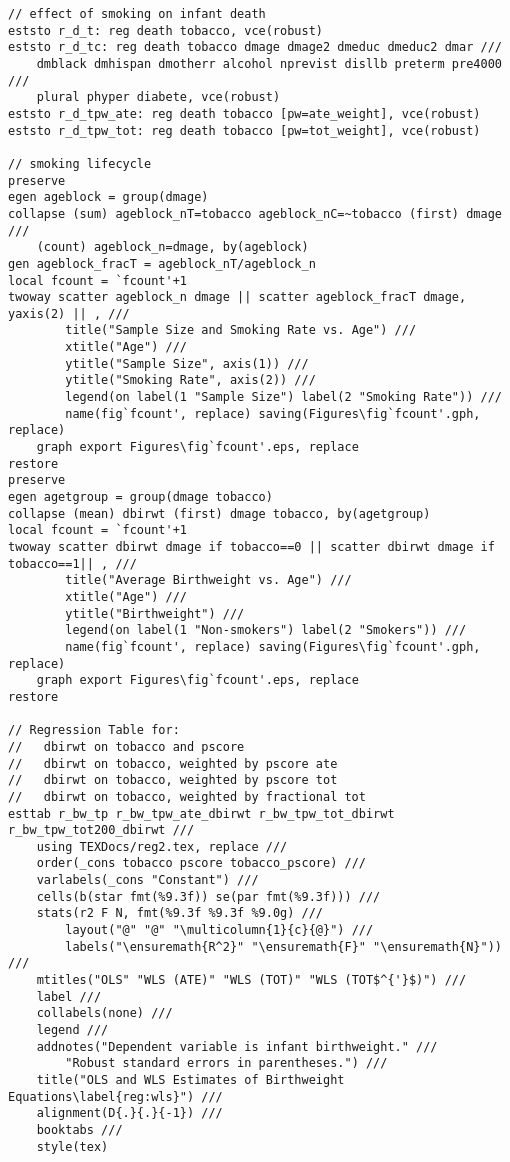 \documentclass{article}
\begin{document}
\begin{verbatim}
// effect of smoking on infant death
eststo r_d_t: reg death tobacco, vce(robust)
eststo r_d_tc: reg death tobacco dmage dmage2 dmeduc dmeduc2 dmar ///
	dmblack dmhispan dmotherr alcohol nprevist disllb preterm pre4000 ///
	plural phyper diabete, vce(robust)
eststo r_d_tpw_ate: reg death tobacco [pw=ate_weight], vce(robust)
eststo r_d_tpw_tot: reg death tobacco [pw=tot_weight], vce(robust)

// smoking lifecycle
preserve
egen ageblock = group(dmage)
collapse (sum) ageblock_nT=tobacco ageblock_nC=~tobacco (first) dmage ///
	(count) ageblock_n=dmage, by(ageblock)
gen ageblock_fracT = ageblock_nT/ageblock_n
local fcount = `fcount'+1
twoway scatter ageblock_n dmage || scatter ageblock_fracT dmage, yaxis(2) || , ///
		title("Sample Size and Smoking Rate vs. Age") ///
		xtitle("Age") ///
		ytitle("Sample Size", axis(1)) ///
		ytitle("Smoking Rate", axis(2)) ///
		legend(on label(1 "Sample Size") label(2 "Smoking Rate")) ///
		name(fig`fcount', replace) saving(Figures\fig`fcount'.gph, replace)
	graph export Figures\fig`fcount'.eps, replace
restore
preserve
egen agetgroup = group(dmage tobacco)
collapse (mean) dbirwt (first) dmage tobacco, by(agetgroup)
local fcount = `fcount'+1
twoway scatter dbirwt dmage if tobacco==0 || scatter dbirwt dmage if tobacco==1|| , ///
		title("Average Birthweight vs. Age") ///
		xtitle("Age") ///
		ytitle("Birthweight") ///
		legend(on label(1 "Non-smokers") label(2 "Smokers")) ///
		name(fig`fcount', replace) saving(Figures\fig`fcount'.gph, replace)
	graph export Figures\fig`fcount'.eps, replace
restore

// Regression Table for:
//   dbirwt on tobacco and pscore 
//   dbirwt on tobacco, weighted by pscore ate
//   dbirwt on tobacco, weighted by pscore tot
//   dbirwt on tobacco, weighted by fractional tot
esttab r_bw_tp r_bw_tpw_ate_dbirwt r_bw_tpw_tot_dbirwt r_bw_tpw_tot200_dbirwt ///
	using TEXDocs/reg2.tex, replace ///
	order(_cons tobacco pscore tobacco_pscore) ///
	varlabels(_cons "Constant") ///
	cells(b(star fmt(%9.3f)) se(par fmt(%9.3f))) ///
	stats(r2 F N, fmt(%9.3f %9.3f %9.0g) ///
		layout("@" "@" "\multicolumn{1}{c}{@}") ///
		labels("\ensuremath{R^2}" "\ensuremath{F}" "\ensuremath{N}")) ///
	mtitles("OLS" "WLS (ATE)" "WLS (TOT)" "WLS (TOT$^{'}$)") ///
	label ///
	collabels(none) ///
	legend ///
	addnotes("Dependent variable is infant birthweight." ///
		"Robust standard errors in parentheses.") ///
	title("OLS and WLS Estimates of Birthweight Equations\label{reg:wls}") ///
	alignment(D{.}{.}{-1}) ///
	booktabs ///
	style(tex)


\end{verbatim}
\end{document}
